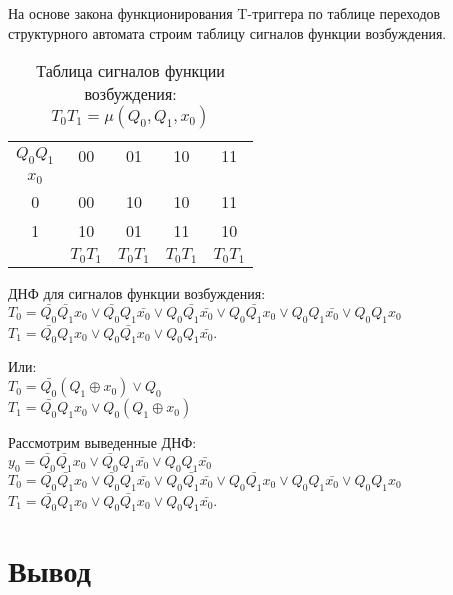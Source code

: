 \documentclass[a4paper,10pt]{article}
\begin{document}
			На основе закона функционирования T-триггера по таблице переходов структурного автомата
			строим таблицу сигналов функции возбуждения. \\

    		\begin{table}[h!]
				\center
        		\begin{tabular}{|c|c|c|c|c|}
        			\hline
            		 $Q_0Q_1$ & 00       & 01       & 10       & 11 \\ 
        			 $x_0$    &          &	        &	       &    \\ \hline
            			 0	  & 00       & 10       & 10       & 11 \\ \hline 
            			 1    & 10       & 01       & 11       & 10 \\ \hline
							  & $T_0T_1$ & $T_0T_1$ & $T_0T_1$ & $T_0T_1$ \\ \hline
        		\end{tabular}
    			\caption{Таблица сигналов функции возбуждения: $T_0T_1 = \mu(Q_0,Q_1,x_0)$}
    		\end{table}

			ДНФ для сигналов функции возбуждения: \\
			$T_0 = \bar{Q_0} \bar{Q_1} x_0 \lor \bar{Q_0} Q_1 \bar{x_0} \lor Q_0 \bar{Q_1} \bar{x_0} \lor Q_0 \bar{Q_1} x_0 \lor Q_0 Q_1 \bar{x_0} \lor Q_0 Q_1 x_0 $ \\
			$T_1 = \bar{Q_0} Q_1 x_0 \lor Q_0 \bar{Q_1} x_0 \lor Q_0 Q_1 \bar{x_0}$.

			Или: \\
			$T_0 = \bar{Q_0} (Q_1 \oplus x_0)\lor Q_0$ \\
			$T_1 = \bar{Q_0} Q_1 x_0 \lor Q_0 (Q_1 \oplus x_0)$

	 		Рассмотрим выведенные ДНФ: \\
        	$y_0 = \bar{Q_0} \bar{Q_1} x_0 \lor \bar{Q_0} Q_1 \bar{x_0} \lor Q_0 Q_1 \bar{x_0}$ \\
			$T_0 = \bar{Q_0} \bar{Q_1} x_0 \lor \bar{Q_0} Q_1 \bar{x_0} \lor Q_0 \bar{Q_1} \bar{x_0} \lor Q_0 \bar{Q_1} x_0 \lor Q_0 Q_1 \bar{x_0} \lor Q_0 Q_1 x_0 $ \\
			$T_1 = \bar{Q_0} Q_1 x_0 \lor Q_0 \bar{Q_1} x_0 \lor Q_0 Q_1 \bar{x_0}$. \\

\section*{Вывод}
\end{document}
